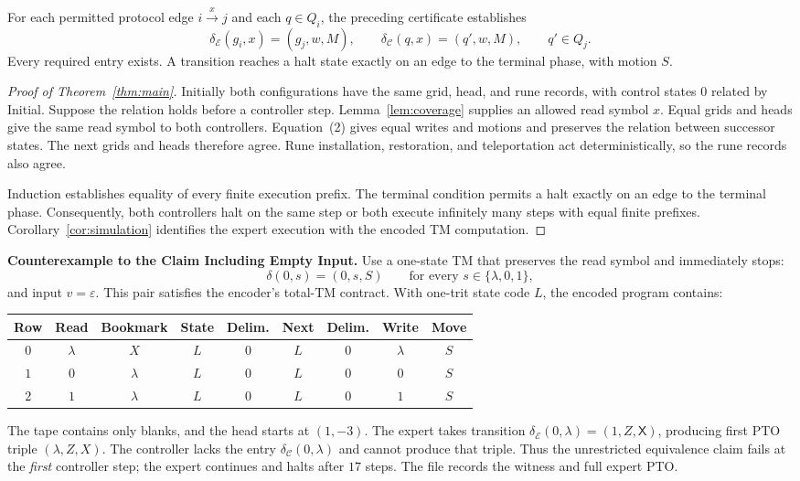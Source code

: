 \documentclass[11pt,a4paper]{article}
\newcommand{\blank}{\lambda}
\newcommand{\EXPERT}{\mathcal E}
\newcommand{\CTRL}{\mathcal C}
\newcommand{\triple}[3]{(#1,#2,\mathsf{#3})}
\newcommand{\sectiontitle}[2]{\refstepcounter{section}\vspace*{2pt}{\LARGE\bfseries\color{Teal}\thesection\quad #2}\par\vspace{7pt}}
\begin{document}
For each permitted protocol edge $i\xrightarrow{x}j$ and each $q\in Q_i$,
the preceding certificate establishes
\begin{equation}
\delta_\EXPERT(g_i,x)=(g_j,w,M),\qquad
\delta_\CTRL(q,x)=(q',w,M),\qquad q'\in Q_j. \tag{2}
\end{equation}
Every required entry exists. A transition reaches a halt state exactly
on an edge to the terminal phase, with motion $S$.

\clearpage
\sectiontitle{5 \enspace EQUIVALENCE PROOF}{Equivalence Proof}\label{sec:common5}
\label{sec:equivalence}
\begin{proof}[Proof of Theorem~\ref{thm:main}]
Initially both configurations have the same grid, head, and rune records,
with control states $0$ related by Initial. Suppose the relation holds
before a controller step. Lemma~\ref{lem:coverage} supplies an allowed read symbol
$x$. Equal grids and heads give the same read symbol to both controllers.
Equation~(2) gives equal writes and motions and preserves the relation
between successor states. The next grids and heads therefore agree.
Rune installation, restoration, and teleportation act deterministically,
so the rune records also agree.

Induction establishes equality of every finite execution prefix. The terminal
condition permits a halt exactly on an edge to the terminal phase.
Consequently, both controllers halt on the same step or both execute
infinitely many steps with equal finite prefixes. Corollary~\ref{cor:simulation}
identifies the expert execution with the encoded TM computation.
\end{proof}

\textbf{Counterexample to the Claim Including Empty Input.}
Use a one-state TM that preserves the read symbol and immediately stops:
\[
\delta(0,s)=(0,s,S)\qquad\text{for every }s\in\{\blank,0,1\},
\]
and input $v=\varepsilon$. This pair satisfies the encoder's total-TM
contract. With one-trit state code $L$, the encoded program contains:
\begin{center}
\small\renewcommand{\arraystretch}{1.25}
\begin{tabular}{c cccccccc}
\toprule\rowcolor{Pale}Row & Read & Bookmark & State & Delim. & Next & Delim. & Write & Move\\\midrule
$0$ & $\blank$ & $X$ & $L$ & $0$ & $L$ & $0$ & $\blank$ & $S$\\
$1$ & $0$ & $\blank$ & $L$ & $0$ & $L$ & $0$ & $0$ & $S$\\
$2$ & $1$ & $\blank$ & $L$ & $0$ & $L$ & $0$ & $1$ & $S$\\
\bottomrule
\end{tabular}
\end{center}
The tape contains only blanks, and the head starts at $(1,-3)$.
The expert takes transition $\delta_\EXPERT(0,\blank)=\triple{1}{Z}{X}$,
producing first PTO triple $(\blank,Z,X)$. The controller lacks the entry
$\delta_\CTRL(0,\blank)$ and cannot produce that triple. Thus the unrestricted equivalence claim
fails at the \emph{first} controller step; the expert continues and halts
after $17$ steps. The file  records the witness and full expert PTO.
\end{document}
